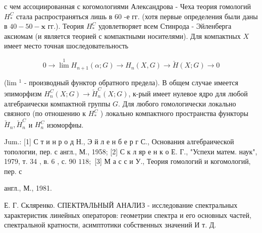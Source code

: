 \documentclass[10pt]{article}
\begin{document}
с чем ассоциированная с когомологиями Александрова - Чеха теория гомологий $H_{*}^{C}$ стала распространяться лишь в 60 -е гг. (хотя первые определения были даны в $40-50-\mathbf{x}$ гг.). Теория $H_{*}^{C}$ удовлетворяет всем Стинрода - Эйленберга аксиомам (и является теорией с компактными носителями). Для компактных $X$ имеет место точная шоследовательность



\[

0 \longrightarrow \lim ^{1} H_{n+1}(\alpha ; G) \longrightarrow H_{n}(X, G) \longrightarrow \check{H}(X ; G) \longrightarrow 0

\]



(lim ${ }^{1}$ - производный функтор обратного предела). В общем случае имеется эпиморфизм $H_{n}^{C}(X ; G) \rightarrow \breve{H}_{n}^{C}(X ; G)$, к-рый имеет нулевое ядро для любой алгебраически компактной группы $G$. Для любого гомологически локально связного (по отношению к $H_{*}^{C}$ ) локально компактного пространства функторы $\check{H}_{n}, \check{H}_{n}^{C}$ и $H_{n}^{C}$ изоморфны.



Jum.: [1] С т и н р о д Н., Э й л е н б е р г С., Основания алгебраической топологии, пер. с англ., М., 1958; [2] С к л яр е н к о Е. Г., "Успехи матем. наук", 1979, т. 34 , в. 6 , с. 90 $118 ;$ [3] М а с с и У., Теория гомологий и когомологий, пер. с

англ., М., 1981.

Е. Г. Скляренко. СПЕКТРАЛЬНЫЙ АНАЛИЗ - исследование спектральных характеристик линейных операторов: геометрии спектра и его основных частей, спектральной кратности, асимптотики собственных значений И т. Д.
\end{document}
